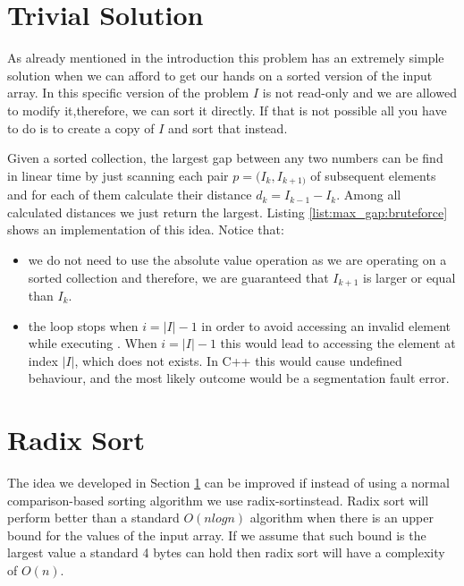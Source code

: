 

\section{Trivial Solution}
\label{max_gap:sec:trivial}
As already mentioned in the introduction this problem has an extremely simple solution when we can
afford to get our hands on a sorted version of the input array. In this specific version of the
problem $I$ is not read-only and we are allowed to modify it,therefore, we can sort it directly. If
that is not possible all you have to do is to create a copy of $I$ and sort that instead. 

Given a sorted collection, the largest gap between any two numbers can be find in linear time by
just scanning each pair $p=(I_k, I_{k+1)}$ of subsequent elements and for each of them calculate
their distance $d_k=I_{k-1}-I_k$. Among all calculated distances we just return the largest. Listing
\ref{list:max_gap:bruteforce} shows an implementation of this idea. Notice that:
\begin{itemize}
	\item we do not need to use the absolute value operation as we are operating on a sorted
	collection and therefore, we are guaranteed that $I_{k+1}$ is larger or equal than $I_k$.
	\item the  loop stops when $i=|I|-1$ in order to avoid accessing an invalid element
	while executing . When $i=|I|-1$ this would lead to accessing the element at
	index $|I|$, which does not exists. In C++ this would cause undefined behaviour, and the most
	likely outcome would be a segmentation fault error.
\end{itemize}




\section{Radix Sort}
\label{max_gap:sec:radix_sort}
The idea we developed in Section \ref{max_gap:sec:trivial} can be improved if instead of using a
normal comparison-based sorting algorithm  we use radix-sort\cite{cit::wiki::radix_sort }instead.
Radix sort will perform better than a standard $O(nlogn)$ algorithm when there is an upper bound for
the values of the input array. If we assume that such bound is the largest value a standard 4 bytes
 can hold then radix sort will have a complexity of $O(n)$.

